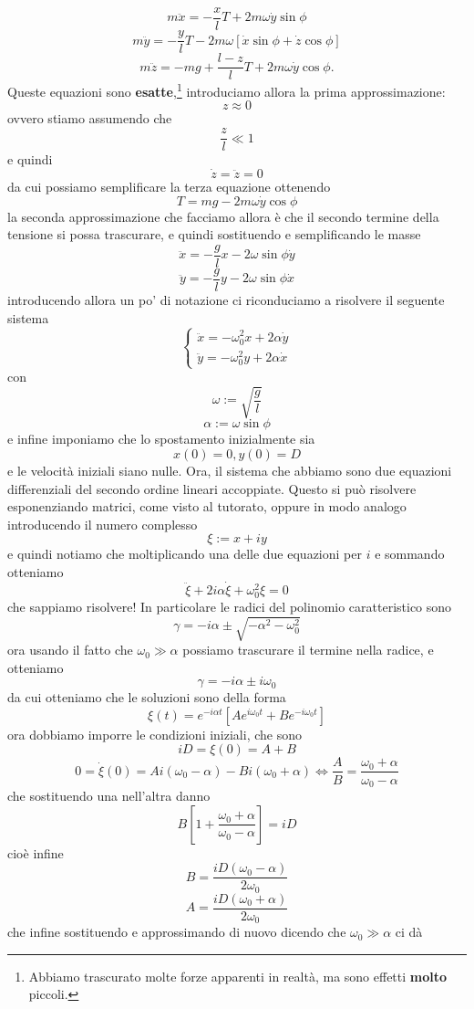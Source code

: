 \documentclass[11pt]{scrartcl}
\begin{document}
	$$m\ddot{x}=-\frac{x}{l}T+2m\omega\dot{y}\sin\phi$$
	$$m\ddot{y}=-\frac{y}{l}T-2m\omega\left[\dot{x}\sin\phi+\dot{z}\cos\phi\right]$$
	$$m\ddot{z}=-mg+\frac{l-z}{l}T+2m\omega\dot{y}\cos\phi.$$
	Queste equazioni sono \textbf{esatte},\footnote{Abbiamo trascurato molte forze apparenti in realtà, ma sono effetti \textbf{molto} piccoli.} introduciamo allora la prima approssimazione: 
	$$z\approx 0$$
	ovvero stiamo assumendo che 
	$$\frac{z}{l}\ll 1$$
	e quindi 
	$$\dot{z}=\ddot{z}=0$$
	da cui possiamo semplificare la terza equazione ottenendo
	$$T=mg-2m\omega\dot{y}\cos\phi$$
	la seconda approssimazione che facciamo allora è che il secondo termine della tensione si possa trascurare, e quindi sostituendo e semplificando le masse
	$$\ddot{x}=-\frac{g}{l}x-2\omega\sin\phi \dot{y}$$
	$$\ddot{y}=-\frac{g}{l}y-2\omega\sin\phi \dot{x}$$
	introducendo allora un po' di notazione ci riconduciamo a risolvere il seguente sistema
	$$
	\begin{cases}
		\ddot{x}=-\omega_0^2x+2\alpha\dot{y} \\
		\ddot{y}=-\omega_0^2y+2\alpha\dot{x}
	\end{cases}
	$$  
	con 
	$$\omega:=\sqrt{\frac{g}{l}}$$
	$$\alpha:=\omega\sin\phi$$
	e infine imponiamo che lo spostamento inizialmente sia
	$$x(0)=0,y(0)=D$$
	e le velocità iniziali siano nulle. Ora, il sistema che abbiamo sono due equazioni differenziali del secondo ordine lineari accoppiate. Questo si può risolvere esponenziando matrici, come visto al tutorato, oppure in modo analogo introducendo il numero complesso
	$$\xi:=x+iy$$
	e quindi notiamo che moltiplicando una delle due equazioni per $i$ e sommando otteniamo
	$$\ddot{\xi}+2i\alpha\dot{\xi}+\omega_0^2\xi=0$$
	che sappiamo risolvere! In particolare le radici del polinomio caratteristico sono
	$$\gamma=-i\alpha\pm\sqrt{-\alpha^2-\omega_0^2}$$
	ora usando il fatto che $\omega_0\gg \alpha$ possiamo trascurare il termine nella radice, e otteniamo
	$$\gamma=-i\alpha\pm i\omega_0$$
	da cui otteniamo che le soluzioni sono della forma
	$$\xi(t)=e^{-i\alpha t}\left[Ae^{i\omega_0t}+Be^{-i\omega_0 t}\right]$$
	ora dobbiamo imporre le condizioni iniziali, che sono
	$$iD=\xi(0)=A+B$$
	$$0=\dot{\xi}(0)=Ai(\omega_0-\alpha)-Bi(\omega_0+\alpha) \iff \frac{A}{B}=\frac{\omega_0+\alpha}{\omega_0-\alpha}$$
	che sostituendo una nell'altra danno
	$$B\left[1+\frac{\omega_0+\alpha}{\omega_0-\alpha}\right]=iD$$
	cioè infine
	$$B=\frac{iD(\omega_0-\alpha)}{2\omega_0}$$
	$$A=\frac{iD(\omega_0+\alpha)}{2\omega_0}$$
	che infine sostituendo e approssimando di nuovo dicendo che $\omega_0\gg \alpha$ ci dà 
\end{document}
